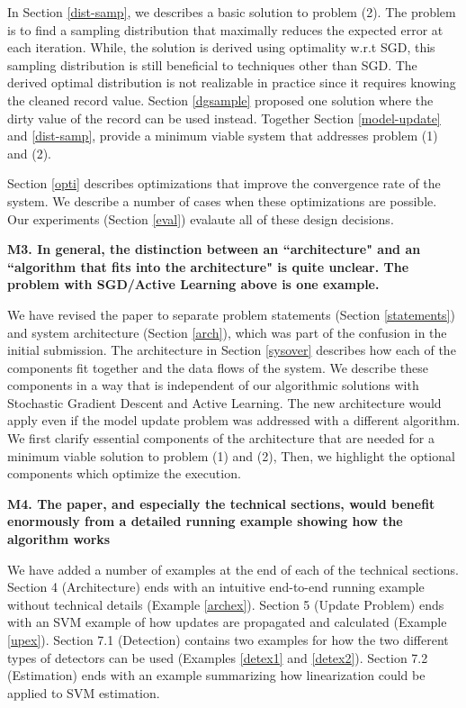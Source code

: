 In Section \ref{dist-samp}, we describes a basic solution to problem (2).
The problem is to find a sampling distribution that maximally reduces the expected error
at each iteration.
While, the solution is derived using optimality w.r.t SGD, this sampling distribution is still beneficial to techniques other than SGD.
The derived optimal distribution is not realizable in practice since it requires knowing the cleaned record value.
Section \ref{dgsample} proposed one solution where the dirty value of the record can be used instead.
Together Section \ref{model-update} and \ref{dist-samp}, provide a minimum viable system that addresses problem (1) and (2).

Section \ref{opti} describes optimizations that improve the convergence rate of the system.
We describe a number of cases when these optimizations are possible.
Our experiments (Section \ref{eval}) evalaute all of these design decisions.

\vspace{0.5em}

\noindent\textbf{M3. In general, the distinction between an ``architecture" and an ``algorithm that fits into the architecture" is quite unclear. The problem with SGD/Active Learning above is one example.}

We have revised the paper to separate problem statements (Section \ref{statements}) and system architecture (Section \ref{arch}), which was part of the confusion in the initial submission.
The architecture in Section \ref{sysover} describes how each of the components fit together and the data flows of the system.
We describe these components in a way that is independent of our algorithmic solutions with Stochastic Gradient Descent and Active Learning.
The new architecture would apply even if the model update problem was addressed with a different algorithm.
We first clarify essential components of the architecture that are needed for a minimum viable solution to problem (1) and (2), 
Then, we highlight the optional components which optimize the execution.

\vspace{0.5em}

\noindent\textbf{M4. The paper, and especially the technical sections, would benefit enormously from a detailed running example showing how the algorithm works}

We have added a number of examples at the end of each of the technical sections. Section 4 (Architecture) ends with an intuitive end-to-end running example without technical details (Example \ref{archex}).
Section 5 (Update Problem) ends with an SVM example of how updates are propagated and calculated (Example \ref{upex}).
Section 7.1 (Detection) contains two examples for how the two different types of detectors can be used (Examples \ref{detex1} and \ref{detex2}).
Section 7.2 (Estimation) ends with an example summarizing how linearization could be applied to SVM estimation.

